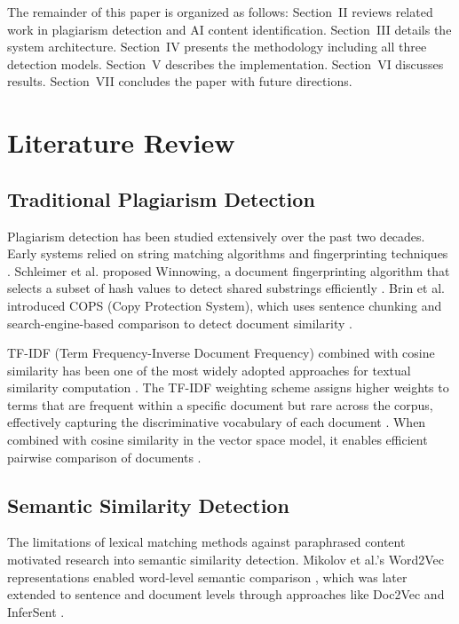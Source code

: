\documentclass[conference]{IEEEtran}
\begin{document}
The remainder of this paper is organized as follows: Section~II reviews related work in plagiarism detection and AI content identification. Section~III details the system architecture. Section~IV presents the methodology including all three detection models. Section~V describes the implementation. Section~VI discusses results. Section~VII concludes the paper with future directions.

\section{Literature Review}

\subsection{Traditional Plagiarism Detection}

Plagiarism detection has been studied extensively over the past two decades. Early systems relied on string matching algorithms and fingerprinting techniques \cite{b10}. Schleimer et al. proposed Winnowing, a document fingerprinting algorithm that selects a subset of hash values to detect shared substrings efficiently \cite{b11}. Brin et al. introduced COPS (Copy Protection System), which uses sentence chunking and search-engine-based comparison to detect document similarity \cite{b10}.

TF-IDF (Term Frequency-Inverse Document Frequency) combined with cosine similarity has been one of the most widely adopted approaches for textual similarity computation \cite{b12}. The TF-IDF weighting scheme assigns higher weights to terms that are frequent within a specific document but rare across the corpus, effectively capturing the discriminative vocabulary of each document \cite{b13}. When combined with cosine similarity in the vector space model, it enables efficient pairwise comparison of documents \cite{b14}.

\subsection{Semantic Similarity Detection}

The limitations of lexical matching methods against paraphrased content motivated research into semantic similarity detection. Mikolov et al.'s Word2Vec representations enabled word-level semantic comparison \cite{b15}, which was later extended to sentence and document levels through approaches like Doc2Vec \cite{b16} and InferSent \cite{b17}.
\end{document}
